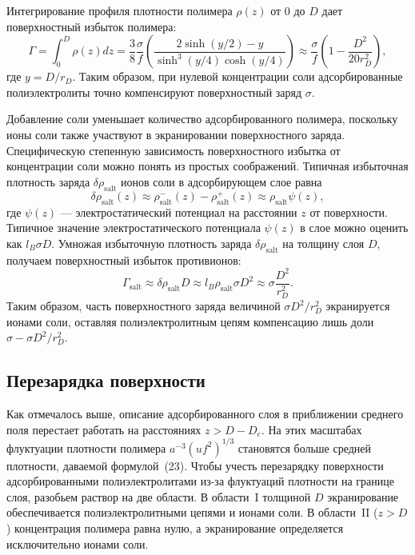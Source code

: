 \documentclass[12pt,a4paper]{article}
\begin{document}
Интегрирование профиля плотности полимера $\rho(z)$ от $0$ до $D$ дает поверхностный избыток полимера:
\begin{equation}
\Gamma = \int_0^D \rho(z) dz = \frac{3}{8}\frac{\sigma}{f} \left( \frac{2\sinh(y/2) - y}{\sinh^3(y/4)\cosh(y/4)} \right) \approx \frac{\sigma}{f} \left( 1 - \frac{D^2}{20 r_D^2} \right),
\end{equation}
где $y = D / r_D$. Таким образом, при нулевой концентрации соли адсорбированные полиэлектролиты точно компенсируют поверхностный заряд $\sigma$.

Добавление соли уменьшает количество адсорбированного полимера, поскольку ионы соли также участвуют в экранировании поверхностного заряда. Специфическую степенную зависимость поверхностного избытка от концентрации соли можно понять из простых соображений. Типичная избыточная плотность заряда $\delta\rho_{\text{salt}}$ ионов соли в адсорбирующем слое равна
\begin{equation}
\delta\rho_{\text{salt}}(z) \approx \rho_{\text{salt}}^-(z) - \rho_{\text{salt}}^+(z) \approx \rho_{\text{salt}} \psi(z),
\end{equation}
где $\psi(z)$ --- электростатический потенциал на расстоянии $z$ от поверхности. Типичное значение электростатического потенциала $\psi(z)$ в слое можно оценить как $l_B \sigma D$. Умножая избыточную плотность заряда $\delta\rho_{\text{salt}}$ на толщину слоя $D$, получаем поверхностный избыток противионов:
\begin{equation}
\Gamma_{\text{salt}} \approx \delta\rho_{\text{salt}} D \approx l_B \rho_{\text{salt}} \sigma D^2 \approx \sigma \frac{D^2}{r_D^2}.
\end{equation}
Таким образом, часть поверхностного заряда величиной $\sigma D^2 / r_D^2$ экранируется ионами соли, оставляя полиэлектролитным цепям компенсацию лишь доли $\sigma - \sigma D^2 / r_D^2$.

\subsection{Перезарядка поверхности}

Как отмечалось выше, описание адсорбированного слоя в приближении среднего поля перестает работать на расстояниях $z > D - D_e$. На этих масштабах флуктуации плотности полимера $a^{-3}(u f^2)^{1/3}$ становятся больше средней плотности, даваемой формулой~(23). Чтобы учесть перезарядку поверхности адсорбированными полиэлектролитами из-за флуктуаций плотности на границе слоя, разобьем раствор на две области. В области~I толщиной $D$ экранирование обеспечивается полиэлектролитными цепями и ионами соли. В области~II ($z > D$) концентрация полимера равна нулю, а экранирование определяется исключительно ионами соли.
\end{document}
